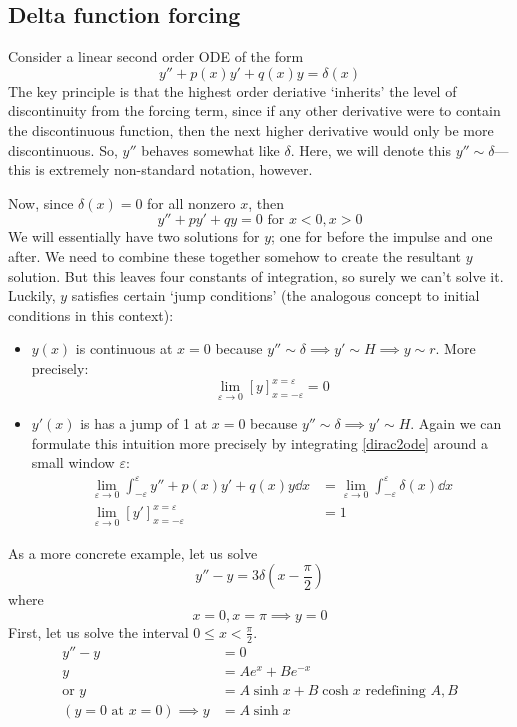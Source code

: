 \subsection{Delta function forcing}
Consider a linear second order ODE of the form
\begin{equation}\label{dirac2ode}
	y'' + p(x)y' + q(x)y = \delta(x)
\end{equation}
The key principle is that the highest order deriative `inherits' the level of discontinuity from the forcing term, since if any other derivative were to contain the discontinuous function, then the next higher derivative would only be more discontinuous.
So, \(y''\) behaves somewhat like \(\delta\).
Here, we will denote this \(y'' \sim \delta\)---this is extremely non-standard notation, however.

Now, since \(\delta(x) = 0\) for all nonzero \(x\), then
\[
	y''+py'+qy=0 \text{ for } x<0, x>0
\]
We will essentially have two solutions for \(y\); one for before the impulse and one after.
We need to combine these together somehow to create the resultant \(y\) solution.
But this leaves four constants of integration, so surely we can't solve it.
Luckily, \(y\) satisfies certain `jump conditions' (the analogous concept to initial conditions in this context):
\begin{itemize}
	\item \(y(x)\) is continuous at \(x=0\) because \(y'' \sim \delta \implies y' \sim H \implies y \sim r\).
	      More precisely:
	      \[
		      \lim_{\varepsilon \to 0} [y]_{x=-\varepsilon}^{x=\varepsilon} = 0
	      \]
	\item \(y'(x)\) is has a jump of 1 at \(x=0\) because \(y'' \sim \delta \implies y' \sim H\).
	      Again we can formulate this intuition more precisely by integrating \eqref{dirac2ode} around a small window \(\varepsilon\):
	      \begin{align*}
		      \lim_{\varepsilon \to 0} \int_{-\varepsilon}^\varepsilon y'' + p(x)y' + q(x)y \dd{x} & = \lim_{\varepsilon \to 0} \int_{-\varepsilon}^\varepsilon \delta(x) \dd{x} \\
		      \lim_{\varepsilon \to 0} [y']_{x=-\varepsilon}^{x=\varepsilon}                       & = 1
	      \end{align*}
\end{itemize}
As a more concrete example, let us solve
\[
	y'' - y = 3 \delta\left(x - \frac{\pi}{2}\right)
\]
where
\[
	x = 0, x = \pi \implies y = 0
\]
First, let us solve the interval \(0 \leq x < \frac{\pi}{2}\).
\begin{align*}
	y'' - y                              & = 0                                              \\
	y                                    & = Ae^x + Be^{-x}                                 \\
	\text{or } y                         & = A \sinh x + B \cosh x \text{ redefining } A, B \\
	(y = 0 \text{ at } x = 0) \implies y & = A \sinh x
\end{align*}

